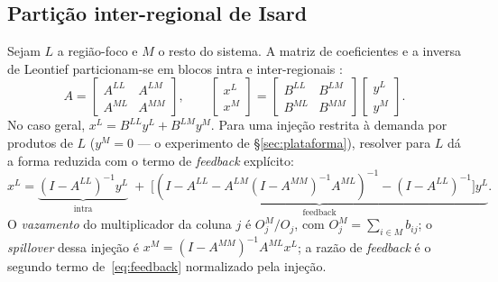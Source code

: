 \documentclass[11pt,a4paper]{article}
\begin{document}
\subsection{Partição inter-regional de Isard}
\label{ap:isard}
Sejam $L$ a região-foco e $M$ o resto do sistema. A matriz de coeficientes e a inversa de
Leontief particionam-se em blocos intra e inter-regionais \citep{isard1951,millerblair2009}:
\begin{equation}
A=\begin{bmatrix} A^{LL} & A^{LM}\\ A^{ML} & A^{MM}\end{bmatrix},
\qquad
\begin{bmatrix} x^{L}\\ x^{M}\end{bmatrix}
=\begin{bmatrix} B^{LL} & B^{LM}\\ B^{ML} & B^{MM}\end{bmatrix}
\begin{bmatrix} y^{L}\\ y^{M}\end{bmatrix}.
\label{eq:isard}
\end{equation}
No caso geral, $x^{L}=B^{LL}y^{L}+B^{LM}y^{M}$. Para uma injeção restrita à demanda por
produtos de $L$ ($y^{M}=0$ --- o experimento de \S\ref{sec:plataforma}), resolver para $L$
dá a forma reduzida com o termo de \emph{feedback} explícito:
\begin{equation}
x^{L}
=\underbrace{(I-A^{LL})^{-1}y^{L}}_{\text{intra}}
\;+\;\underbrace{\big[(I-A^{LL}-A^{LM}(I-A^{MM})^{-1}A^{ML})^{-1}-(I-A^{LL})^{-1}\big]y^{L}}_{\text{feedback}}.
\label{eq:feedback}
\end{equation}
O \emph{vazamento} do multiplicador da coluna $j$ é $O^{M}_j/O_j$, com
$O^{M}_j=\sum_{i\in M}b_{ij}$; o \emph{spillover} dessa injeção é
$x^{M}=(I-A^{MM})^{-1}A^{ML}x^{L}$; a razão de \emph{feedback} é o segundo termo
de~\eqref{eq:feedback} normalizado pela injeção.
\end{document}
